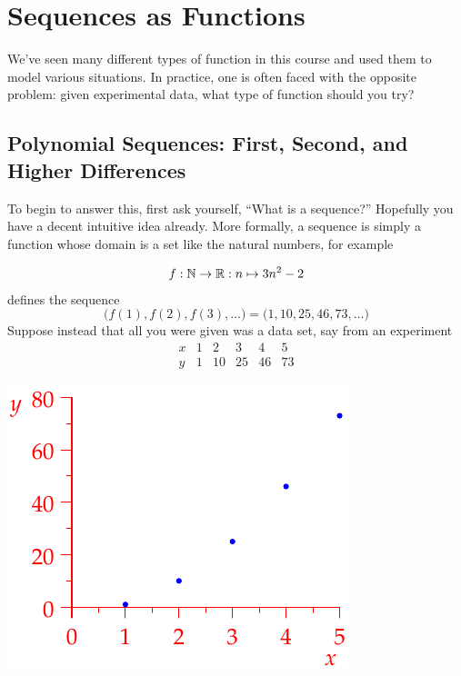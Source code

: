 \graphicspath{{4seq/asy/}}


\section{Sequences as Functions}

We've seen many different types of function in this course and used them to model various situations. In practice, one is often faced with the opposite problem: given experimental data, what type of function should you try?

\subsection{Polynomial Sequences: First, Second, and Higher Differences}

To begin to answer this, first ask yourself, ``What is a sequence?'' Hopefully you have a decent intuitive idea already. More formally, a sequence is simply a function whose domain is a set like the natural numbers, for example\par
\begin{minipage}[t]{0.6\linewidth}\vspace{-8pt}
\[f:\mathbb{N}\to\mathbb{R}:n\mapsto 3n^2-2\]
defines the sequence
\[\bigl(f(1),f(2),f(3),\ldots\bigr)=\bigl(1,10,25,46,73,\ldots\bigr)\]
Suppose instead that all you were given was a data set, say from an experiment
\[\begin{array}{c|ccccc}
x&1&2&3&4&5\\\hline
y&1&10&25&46&73
\end{array}\]
\end{minipage}\hfill\begin{minipage}[t]{0.39\linewidth}\vspace{-10pt}
\flushright\includegraphics{seqquadex}
\end{minipage}
\bigbreak

